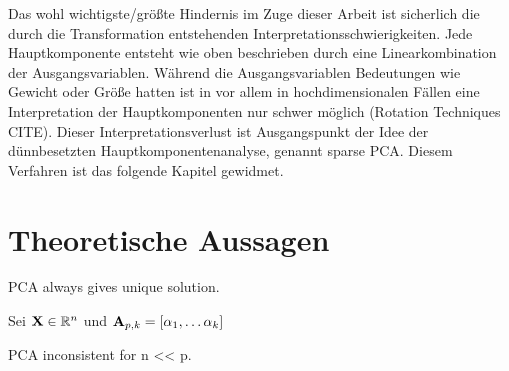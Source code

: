 Das wohl wichtigste/größte Hindernis im Zuge dieser Arbeit ist sicherlich die durch die Transformation entstehenden Interpretationsschwierigkeiten. Jede Hauptkomponente entsteht wie oben beschrieben durch eine Linearkombination der Ausgangsvariablen. Während die Ausgangsvariablen Bedeutungen wie Gewicht oder Größe hatten ist in vor allem in hochdimensionalen Fällen eine Interpretation der Hauptkomponenten nur schwer möglich (Rotation Techniques CITE). Dieser Interpretationsverlust ist Ausgangspunkt der Idee der dünnbesetzten Hauptkomponentenanalyse, genannt sparse PCA. Diesem Verfahren ist das folgende Kapitel gewidmet.


\section{Theoretische Aussagen}

\begin{thm}
PCA always gives unique solution.
\end{thm}

\begin{thm}
Sei $\mathbf{X} \in \mathbb{R}^n$ und $\mathbf{A}_{p,k} = [\alpha_1, \ldots \alpha_k] $   
\end{thm}

\begin{thm}
PCA inconsistent for n << p.
\end{thm}

